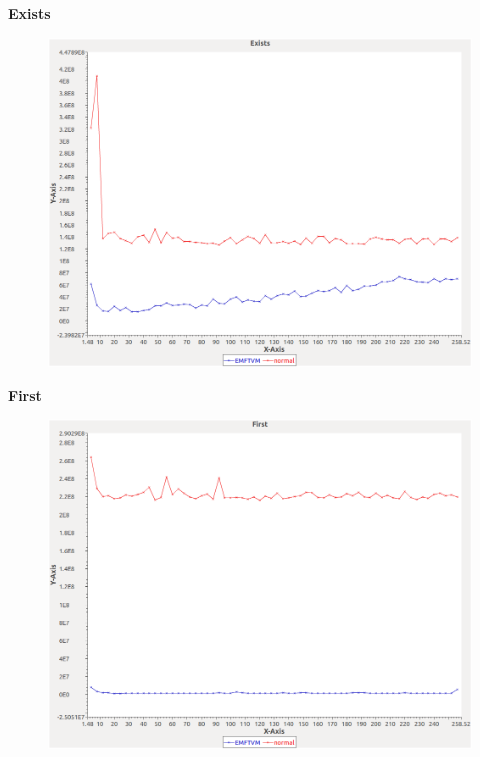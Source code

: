 \noindent\textbf{Exists}

\begin{figure}[h]
\centering
\includegraphics[width=\textwidth]{graphs/sequence/Exists}
\end{figure}
\pagebreak

\noindent\textbf{First}

\begin{figure}[h]
\centering
\includegraphics[width=\textwidth]{graphs/sequence/First}
\end{figure}
\pagebreak

